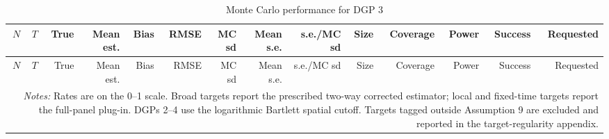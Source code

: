 \begingroup
\small
\begin{longtable}{rrrrrrrrrrrrrr}
\caption{Monte Carlo performance for DGP 3}\label{tab:mc-dgp3}\\
\toprule
$N$ & $T$ & True & Mean est. & Bias & RMSE & MC sd & Mean s.e. & s.e./MC sd & Size & Coverage & Power & Success & Requested \\
\midrule
\endfirsthead
\toprule
$N$ & $T$ & True & Mean est. & Bias & RMSE & MC sd & Mean s.e. & s.e./MC sd & Size & Coverage & Power & Success & Requested \\
\midrule
\endhead
\bottomrule
\multicolumn{14}{p{0.96\linewidth}}{\footnotesize \textit{Notes:} Rates are on the 0--1 scale. Broad targets report the prescribed two-way corrected estimator; local and fixed-time targets report the full-panel plug-in. DGPs 2--4 use the logarithmic Bartlett spatial cutoff. Targets tagged outside Assumption 9 are excluded and reported in the target-regularity appendix.} \\
\end{longtable}
\endgroup
